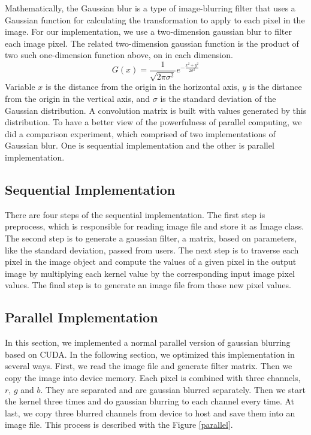 \documentclass[journal,11pt,onecolumn,draftclsnofoot]{ieeeconf}  %
\begin{document}
Mathematically, the Gaussian blur is a type of image-blurring filter that uses a Gaussian function for calculating the transformation to apply to each pixel in the image.  For our implementation, we use a two-dimension gaussian blur to filter each image pixel. The related two-dimension gaussian function is the product of two such one-dimension function above, on in each dimension. 
  \[G(x) = \frac{1}{ \sqrt{2 \pi   \sigma ^{2} } } e^{ -\frac{ x^{2} +  y^{2}}{2  \sigma ^{2} }}\]
 Variable $x$ is the distance from the origin in the horizontal axis, $y$ is the distance from the origin in the vertical axis, and $\sigma$ is the standard deviation of the Gaussian distribution. A convolution matrix is built with values generated by this distribution.  
 To have a better view of the powerfulness of parallel computing, we did a comparison experiment, which comprised of two implementations of Gaussian blur. One is sequential implementation and the other is parallel implementation. 

\subsection{Sequential  Implementation}\label{Sequential}
There are four steps of the sequential implementation. The first step is preprocess, which is responsible for reading image file and store it as Image class. The second step is to generate a gaussian filter, a matrix, based on parameters, like the standard deviation,  passed from users. The next step is to traverse each pixel in the image object and compute the values of a given pixel in the output image by multiplying each kernel value by the corresponding input image pixel values. The final step is to generate an image file from those new pixel values.

\subsection{Parallel  Implementation} \label{GPU}
In this section, we implemented a normal parallel version of gaussian blurring based on CUDA. In the following section, we optimized this implementation in several ways.  First, we read the image file and generate filter matrix. Then we copy the image into device memory. Each pixel is combined with three channels, $r$, $g$ and $b$.  They are separated and are gaussian blurred separately. Then we start the kernel three times and do gaussian blurring to each channel every time.  At last, we copy three blurred channels from device to host and save them into an image file. This process is described with the Figure \ref{parallel}.
\end{document}
